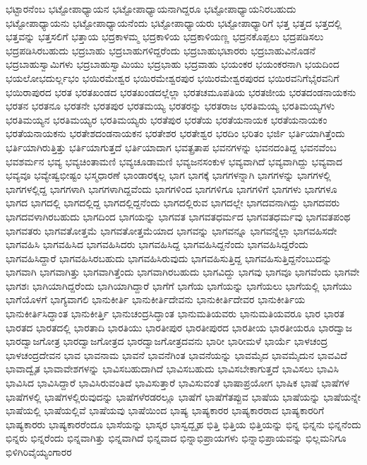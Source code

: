 {ಭಟ್ಟಾರನೆಂಬ
ಭಟ್ಟೋಪಾಧ್ಯಾಯನ
ಭಟ್ಟೋಪಾಧ್ಯಾಯನಾಗಿದ್ದರೂ
ಭಟ್ಟೋಪಾಧ್ಯಾಯನಿರಬಹುದು
ಭಟ್ಟೋಪಾಧ್ಯಾಯನು
ಭಟ್ಟೋಪಾಧ್ಯಾಯನೆಂದು
ಭಟ್ಟೋಪಾಧ್ಯಾಯರು
ಭಟ್ಟೋಪಾಧ್ಯಾರಿಗೆ
ಭತ್ತ
ಭತ್ತದ
ಭತ್ತದಲ್ಲಿ
ಭತ್ತವನ್ನು
ಭತ್ತಸಲಿಗೆ
ಭತ್ತಾಯ
ಭದ್ರಕಾಳಮ್ಮ
ಭದ್ರಕಾಳಿಯ
ಭದ್ರಕಾಳಿಯಣ್ಣ
ಭದ್ರನಕೊಪ್ಪಲು
ಭದ್ರಪಡಿಸಲು
ಭದ್ರಪಡಿಸಿರಬಹುದು
ಭದ್ರಬಾಹು
ಭದ್ರಬಾಹುಗಳಿದ್ದರೆಂದು
ಭದ್ರಬಾಹುಭಟಾರರು
ಭದ್ರಬಾಹುವಿನೊಡನೆ
ಭದ್ರಬಾಹುಸ್ವಾಮಿಗಳು
ಭದ್ರಬಾಹುಸ್ವಾಮಿಯು
ಭದ್ರಭಾಹು
ಭದ್ರವಾಹು
ಭಯಂಕರ
ಭಯಂಕರನಾಗಿ
ಭಯದಿಂದ
ಭಯಲೋಭದುರ್ಲ್ಲಭಂ
ಭಯಿರಮೇಶ್ವರ
ಭಯಿರಮೇಶ್ವರಪುರ
ಭಯಿರಮೇಶ್ವರಪುರದ
ಭಯಿರವನಿಗೆಭೈರವನಿಗೆ
ಭಯಿರಾಪುರದ
ಭರತ
ಭರತಖಂಡದ
ಭರತಖಂಡದಲ್ಲೆಲ್ಲಾ
ಭರತಚಮೂಪತಿಯ
ಭರತಜೀಯ
ಭರತದಂಡನಾಯಕನು
ಭರತನ
ಭರತನೂ
ಭರತನೇ
ಭರತಪುರ
ಭರತಮಯ್ಯ
ಭರತರನ್ನು
ಭರತರಾಜ
ಭರತಿಮಯ್ಯ
ಭರತಿಮಯ್ಯಗಳು
ಭರತಿಮಯ್ಯನ
ಭರತಿಮಯ್ಯರ
ಭರತಿಮಯ್ಯರು
ಭರತೆಪುರ
ಭರತೆಯ
ಭರತೆಯನಾಯಕ
ಭರತೆಯನಾಯಕಂ
ಭರತೆಯನಾಯಕನು
ಭರತೇಶದಂಡನಾಯಕನ
ಭರತೇಶರ
ಭರತೇಶ್ವರ
ಭರದಿಂ
ಭರಿತಂ
ಭರ್ಜಿ
ಭರ್ತಿಯಾಗಿತ್ತೆಂದು
ಭರ್ತಿಯಾಗಿರುತ್ತಿತ್ತು
ಭರ್ತಿಯಾಗುತ್ತದೆ
ಭರ್ತಿಯಾದಾಗ
ಭವತ್ಪ್ರತಾಪ
ಭವನಗಳನ್ನು
ಭವನದಂತಿದ್ದ
ಭವನವೆಂಬ
ಭವಶರ್ಮನ
ಭವ್ಯ
ಭವ್ಯಚಿಂತಾಮಣಿ
ಭವ್ಯಚೂಡಾಮಣಿ
ಭವ್ಯಜನಸಂಕುಳ
ಭವ್ಯವಾಗಿದೆ
ಭವ್ಯವಾಗಿದ್ದು
ಭವ್ಯವಾದ
ಭವ್ಯವೂ
ಭವ್ಯೇಷ್ವಭೀಷ್ಟಂ
ಭಸ್ಮಧಾರಣೆ
ಭಾಂಡಾರಕ್ಕಲ್ಲ
ಭಾಗ
ಭಾಗಕ್ಕೆ
ಭಾಗಗಳನ್ನಾಗಿ
ಭಾಗಗಳನ್ನು
ಭಾಗಗಳಲ್ಲಿ
ಭಾಗಗಳಲ್ಲಿದ್ದ
ಭಾಗಗಳಾಗಿ
ಭಾಗಗಳಾಗಿದ್ದವೆಂದು
ಭಾಗಗಳಿಂದ
ಭಾಗಗಳಿಗೂ
ಭಾಗಗಳಿಗೆ
ಭಾಗಗಳು
ಭಾಗಗಳೂ
ಭಾಗದ
ಭಾಗದಲ್ಲಿ
ಭಾಗದಲ್ಲಿದ್ದ
ಭಾಗದಲ್ಲಿದ್ದನೆಂದು
ಭಾಗದಲ್ಲಿರುವ
ಭಾಗದಲ್ಲೇ
ಭಾಗದವನಾಗಿದ್ದು
ಭಾಗದವರು
ಭಾಗದವಳಾಗಿರಬಹುದು
ಭಾಗದಿಂದ
ಭಾಗಯನ್ನು
ಭಾಗವತ
ಭಾಗವತಧರ್ಮದ
ಭಾಗವತಧರ್ಮವು
ಭಾಗವತಪಂಥ
ಭಾಗವತರು
ಭಾಗವತೋತ್ತಮೆ
ಭಾಗವತೋತ್ತಮೆಯಾದ
ಭಾಗವನ್ನು
ಭಾಗವನ್ನೂ
ಭಾಗವನ್ನೆಲ್ಲಾ
ಭಾಗವಹಿಸದೇ
ಭಾಗವಹಿಸಿ
ಭಾಗವಹಿಸಿದ
ಭಾಗವಹಿಸಿದರು
ಭಾಗವಹಿಸಿದ್ದ
ಭಾಗವಹಿಸಿದ್ದನೆಂದು
ಭಾಗವಹಿಸಿದ್ದರೆಂದು
ಭಾಗವಹಿಸಿದ್ದಾರೆ
ಭಾಗವಹಿಸಿರಬಹುದು
ಭಾಗವಹಿಸಿರುವುದು
ಭಾಗವಹಿಸುತ್ತಿದ್ದ
ಭಾಗವಹಿಸುತ್ತಿದ್ದನೆಂಬುದನ್ನು
ಭಾಗವಾಗಿ
ಭಾಗವಾಗಿತ್ತು
ಭಾಗವಾಗಿತ್ತೆಂದು
ಭಾಗವಾಗಿರಬಹುದು
ಭಾಗವಿದ್ದು
ಭಾಗವು
ಭಾಗವೂ
ಭಾಗವೆಂದು
ಭಾಗವೇ
ಭಾಗಶಃ
ಭಾಗಿಯಾಗಿದ್ದರೆಂದು
ಭಾಗಿಯಾಗಿದ್ದಾರೆ
ಭಾಗೆಗೆ
ಭಾಗೆಯ
ಭಾಗೆಯನ್ನು
ಭಾಗೆಯಲು
ಭಾಗೆಯಲ್ಲಿ
ಭಾಗೆಯು
ಭಾಗೆಯೊಳಗೆ
ಭಾಗ್ಯವಾಗಲಿ
ಭಾನುಕೀರ್ತಿ
ಭಾನುಕೀರ್ತಿದೇವನು
ಭಾನುಕೀರ್ತಿದೇವರ
ಭಾನುಕೀರ್ತಿಯ
ಭಾನುಕೀರ್ತಿಸಿದ್ಧಾಂತ
ಭಾನುಕೀರ್ತ್ತಿ
ಭಾನುಚಂದ್ರಸಿದ್ಧಾಂತ
ಭಾನುಮತಿಯವರು
ಭಾನುಮತಿಯವರೂ
ಭಾರ
ಭಾರತ
ಭಾರತದ
ಭಾರತದಲ್ಲಿ
ಭಾರತಾದಿ
ಭಾರತಿಯು
ಭಾರತೀಪುರ
ಭಾರತೀಪುರದ
ಭಾರತೀಯ
ಭಾರತೀಯರೂ
ಭಾರದ್ವಾಜ
ಭಾರದ್ವಾಜಗೋತ್ರ
ಭಾರದ್ವಾಜಗೋತ್ರದ
ಭಾರದ್ವಾಜಗೋತ್ರದವನು
ಭಾರೀ
ಭಾರೀಮಳೆ
ಭಾರ್ಯೆ
ಭಾಳಚಂದ್ರ
ಭಾಳಚಂದ್ರದೇವನ
ಭಾವ
ಭಾವನಾಮ
ಭಾವನೆ
ಭಾವನೆಗಿಂತ
ಭಾವನೆಯನ್ನು
ಭಾವಮೈದ
ಭಾವಮೈದುನ
ಭಾವವಿದೆ
ಭಾವಾದ್ವೈತ
ಭಾವಾವೇಶಗಳನ್ನು
ಭಾವಿಸಬಹುದಾಗಿದೆ
ಭಾವಿಸಬಹುದು
ಭಾವಿಸಬೇಕಾಗುತ್ತದೆ
ಭಾವಿಸಲು
ಭಾವಿಸಿ
ಭಾವಿಸಿದ
ಭಾವಿಸಿದ್ದಾರೆ
ಭಾವಿಸಿರುವಂತಿದೆ
ಭಾವಿಸುತ್ತಾರೆ
ಭಾವಿಸುವಂತೆ
ಭಾಷಾಪ್ರಯೋಗ
ಭಾಷಿಕ
ಭಾಷೆ
ಭಾಷೆಗಳ
ಭಾಷೆಗಳಲ್ಲಿ
ಭಾಷೆಗಳಲ್ಲಿರುವುದನ್ನು
ಭಾಷೆಗಳೆರಡರಲ್ಲೂ
ಭಾಷೆಗೆ
ಭಾಷೆಗೆತಪ್ಪುವ
ಭಾಷೆಯ
ಭಾಷೆಯನ್ನು
ಭಾಷೆಯನ್ನೇ
ಭಾಷೆಯಲ್ಲಿ
ಭಾಷೆಯಲ್ಲಿವೆ
ಭಾಷೆಯವು
ಭಾಷೆಯಿಂದ
ಭಾಷ್ಯ
ಭಾಷ್ಯಕಾರರ
ಭಾಷ್ಯಕಾರರಾದ
ಭಾಷ್ಯಕಾರರಿಗೆ
ಭಾಷ್ಯಕಾರರು
ಭಾಷ್ಯಕಾರರೆಂದೂ
ಭಾಸೆಯನ್ನು
ಭಾಸ್ಕರ
ಭಾಸ್ವದ್ಬೃಹ
ಭಿತ್ತಿ
ಭಿತ್ತಿಯ
ಭಿತ್ತಿಯನ್ನು
ಭಿನ್ನ
ಭಿನ್ನನು
ಭಿನ್ನನೆಂದು
ಭಿನ್ನರು
ಭಿನ್ನರೆಂದು
ಭಿನ್ನವಾಗಿತ್ತು
ಭಿನ್ನವಾಗಿದೆ
ಭಿನ್ನವಾದ
ಭಿನ್ನಾಭಿಪ್ರಾಯಗಳು
ಭಿನ್ನಾಭಿಪ್ರಾಯವನ್ನು
ಭಿಲ್ಲಮನಿಗೂ
ಭಿಳಿಗಿರಿವೈಯ್ಯಂಗಾರರ
}
